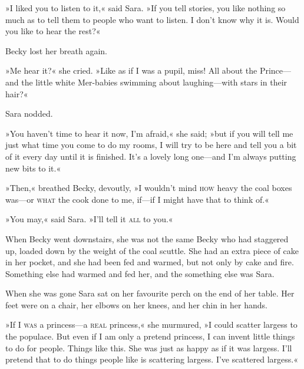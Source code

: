 »I liked you to listen to it,« said Sara. »If you tell stories, you like nothing so much as to tell them to people who want to listen. I don't know why it is. Would you like to hear the rest?«

Becky lost her breath again.

»Me hear it?« she cried. »Like as if I was a pupil, miss! All about the Prince—and the little white Mer-babies swimming about laughing—with stars in their hair?«

Sara nodded.

»You haven't time to hear it now, I'm afraid,« she said; »but if you will tell me just what time you come to do my rooms, I will try to be here and tell you a bit of it every day until it is finished. It's a lovely long one—and I'm always putting new bits to it.«

»Then,« breathed Becky, devoutly, »I wouldn't mind \textsc{how} heavy the coal boxes was—or \textsc{what} the cook done to me, if—if I might have that to think of.«

»You may,« said Sara. »I'll tell it \textsc{all} to you.«

When Becky went downstairs, she was not the same Becky who had staggered up, loaded down by the weight of the coal scuttle. She had an extra piece of cake in her pocket, and she had been fed and warmed, but not only by cake and fire. Something else had warmed and fed her, and the something else was Sara.

When she was gone Sara sat on her favourite perch on the end of her table. Her feet were on a chair, her elbows on her knees, and her chin in her hands.

»If I \textsc{was} a princess—a \textsc{real} princess,« she murmured, »I could scatter largess to the populace. But even if I am only a pretend princess, I can invent little things to do for people. Things like this. She was just as happy as if it was largess. I'll pretend that to do things people like is scattering largess. I've scattered largess.«

